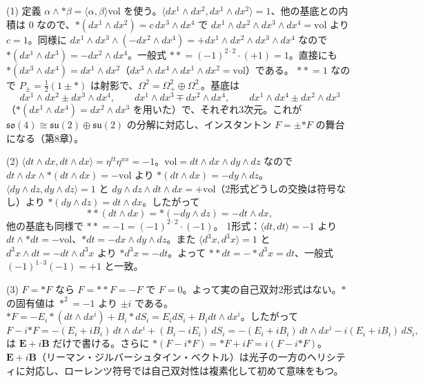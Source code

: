 \begin{solution}
(1) 定義 $\alpha\wedge{*\beta}=\langle\alpha,\beta\rangle\mathrm{vol}$ を使う。$\langle dx^1\wedge dx^2,dx^1\wedge dx^2\rangle=1$、他の基底との内積は $0$ なので、${*}(dx^1\wedge dx^2)=c\,dx^3\wedge dx^4$ で $dx^1\wedge dx^2\wedge dx^3\wedge dx^4=\mathrm{vol}$ より $c=1$。同様に $dx^1\wedge dx^3\wedge(-dx^2\wedge dx^4)=+dx^1\wedge dx^2\wedge dx^3\wedge dx^4$ なので ${*}(dx^1\wedge dx^3)=-dx^2\wedge dx^4$。一般式 ${**}=(-1)^{2\cdot2}\cdot(+1)=1$。直接にも ${*}(dx^3\wedge dx^4)=dx^1\wedge dx^2$（$dx^3\wedge dx^4\wedge dx^1\wedge dx^2=\mathrm{vol}$）である。
${**}=1$ なので $P_\pm=\frac12(1\pm{*})$ は射影で、$\Omega^2=\Omega^2_+\oplus\Omega^2_-$。基底は
\[
dx^1\wedge dx^2\pm dx^3\wedge dx^4,\qquad dx^1\wedge dx^3\mp dx^2\wedge dx^4,\qquad dx^1\wedge dx^4\pm dx^2\wedge dx^3
\]
（${*}(dx^1\wedge dx^4)=dx^2\wedge dx^3$ を用いた）で、それぞれ3次元。これが $\mathfrak{so}(4)\cong\mathfrak{su}(2)\oplus\mathfrak{su}(2)$ の分解に対応し、インスタントン $F=\pm{*F}$ の舞台になる（第8章）。

(2) $\langle dt\wedge dx,dt\wedge dx\rangle=\eta^{tt}\eta^{xx}=-1$。$\mathrm{vol}=dt\wedge dx\wedge dy\wedge dz$ なので $dt\wedge dx\wedge{*}(dt\wedge dx)=-\mathrm{vol}$ より ${*}(dt\wedge dx)=-dy\wedge dz$。$\langle dy\wedge dz,dy\wedge dz\rangle=1$ と $dy\wedge dz\wedge dt\wedge dx=+\mathrm{vol}$（2形式どうしの交換は符号なし）より ${*}(dy\wedge dz)=dt\wedge dx$。したがって
\[
{**}(dt\wedge dx)={*}(-dy\wedge dz)=-dt\wedge dx ,
\]
他の基底も同様で ${**}=-1=(-1)^{2\cdot2}\cdot(-1)$。
1形式：$\langle dt,dt\rangle=-1$ より $dt\wedge{*dt}=-\mathrm{vol}$、${*dt}=-dx\wedge dy\wedge dz$。また $\langle d^3x,d^3x\rangle=1$ と $d^3x\wedge dt=-dt\wedge d^3x$ より ${*}d^3x=-dt$。よって ${**}dt=-{*}d^3x=dt$、一般式 $(-1)^{1\cdot3}(-1)=+1$ と一致。

(3) $F={*F}$ なら $F={**F}=-F$ で $F=0$。よって実の自己双対2形式はない。${*}$ の固有値は ${*}^2=-1$ より $\pm i$ である。
${*F}=-E_i{*}(dt\wedge dx^i)+B_i{*}dS_i=E_idS_i+B_idt\wedge dx^i$。したがって
\[
F-i{*F}=-(E_i+iB_i)\,dt\wedge dx^i+(B_i-iE_i)\,dS_i=-(E_i+iB_i)\,dt\wedge dx^i-i(E_i+iB_i)\,dS_i ,
\]
は $\bm E+i\bm B$ だけで書ける。さらに ${*}(F-i{*F})={*F}+iF=i(F-i{*F})$。$\bm E+i\bm B$（リーマン・ジルバーシュタイン・ベクトル）は光子の一方のヘリシティに対応し、ローレンツ符号では自己双対性は複素化して初めて意味をもつ。
\end{solution}

